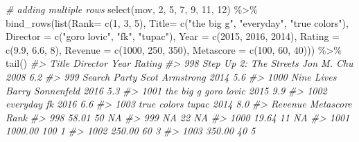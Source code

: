 \documentclass[
]{book}
\newenvironment{Shaded}{\begin{snugshade}}{\end{snugshade}}
\newcommand{\AttributeTok}[1]{\textcolor[rgb]{0.77,0.63,0.00}{#1}}
\newcommand{\CommentTok}[1]{\textcolor[rgb]{0.56,0.35,0.01}{\textit{#1}}}
\newcommand{\DecValTok}[1]{\textcolor[rgb]{0.00,0.00,0.81}{#1}}
\newcommand{\FloatTok}[1]{\textcolor[rgb]{0.00,0.00,0.81}{#1}}
\newcommand{\FunctionTok}[1]{\textcolor[rgb]{0.00,0.00,0.00}{#1}}
\newcommand{\NormalTok}[1]{#1}
\newcommand{\SpecialCharTok}[1]{\textcolor[rgb]{0.00,0.00,0.00}{#1}}
\newcommand{\StringTok}[1]{\textcolor[rgb]{0.31,0.60,0.02}{#1}}
\begin{document}
\begin{Shaded}
\begin{Highlighting}[]
\CommentTok{\# adding multiple rows}
\FunctionTok{select}\NormalTok{(mov, }\DecValTok{2}\NormalTok{, }\DecValTok{5}\NormalTok{, }\DecValTok{7}\NormalTok{, }\DecValTok{9}\NormalTok{, }\DecValTok{11}\NormalTok{, }\DecValTok{12}\NormalTok{) }\SpecialCharTok{\%\textgreater{}\%}
  \FunctionTok{bind\_rows}\NormalTok{(}\FunctionTok{list}\NormalTok{(}\AttributeTok{Rank=} \FunctionTok{c}\NormalTok{(}\DecValTok{1}\NormalTok{, }\DecValTok{3}\NormalTok{, }\DecValTok{5}\NormalTok{),}
                 \AttributeTok{Title=} \FunctionTok{c}\NormalTok{(}\StringTok{"the big g"}\NormalTok{, }\StringTok{"everyday"}\NormalTok{, }\StringTok{"true colors"}\NormalTok{), }
                 \AttributeTok{Director =} \FunctionTok{c}\NormalTok{(}\StringTok{"goro lovic"}\NormalTok{, }\StringTok{"fk"}\NormalTok{, }\StringTok{"tupac"}\NormalTok{), }
                 \AttributeTok{Year =} \FunctionTok{c}\NormalTok{(}\DecValTok{2015}\NormalTok{, }\DecValTok{2016}\NormalTok{, }\DecValTok{2014}\NormalTok{), }
                 \AttributeTok{Rating =} \FunctionTok{c}\NormalTok{(}\FloatTok{9.9}\NormalTok{, }\FloatTok{6.6}\NormalTok{, }\DecValTok{8}\NormalTok{), }
                 \AttributeTok{Revenue =} \FunctionTok{c}\NormalTok{(}\DecValTok{1000}\NormalTok{, }\DecValTok{250}\NormalTok{, }\DecValTok{350}\NormalTok{), }
                 \AttributeTok{Metascore =} \FunctionTok{c}\NormalTok{(}\DecValTok{100}\NormalTok{, }\DecValTok{60}\NormalTok{, }\DecValTok{40}\NormalTok{))) }\SpecialCharTok{\%\textgreater{}\%}
\FunctionTok{tail}\NormalTok{()}
\CommentTok{\#\textgreater{}                       Title         Director Year Rating}
\CommentTok{\#\textgreater{} 998  Step Up 2: The Streets       Jon M. Chu 2008    6.2}
\CommentTok{\#\textgreater{} 999            Search Party   Scot Armstrong 2014    5.6}
\CommentTok{\#\textgreater{} 1000             Nine Lives Barry Sonnenfeld 2016    5.3}
\CommentTok{\#\textgreater{} 1001              the big g       goro lovic 2015    9.9}
\CommentTok{\#\textgreater{} 1002               everyday               fk 2016    6.6}
\CommentTok{\#\textgreater{} 1003            true colors            tupac 2014    8.0}
\CommentTok{\#\textgreater{}      Revenue Metascore Rank}
\CommentTok{\#\textgreater{} 998    58.01        50   NA}
\CommentTok{\#\textgreater{} 999       NA        22   NA}
\CommentTok{\#\textgreater{} 1000   19.64        11   NA}
\CommentTok{\#\textgreater{} 1001 1000.00       100    1}
\CommentTok{\#\textgreater{} 1002  250.00        60    3}
\CommentTok{\#\textgreater{} 1003  350.00        40    5}
\end{Highlighting}
\end{Shaded}
\end{document}
